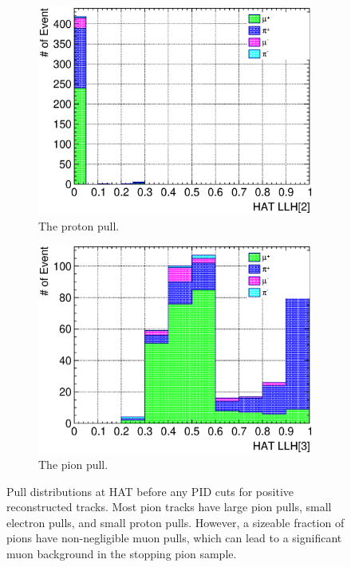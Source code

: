\begin{figure}[ht]
\begin{subfigure}{\dbfigwid\textwidth}
               \end{subfigure}
               \\
               \begin{subfigure}{\dbfigwid\textwidth}
                    \includegraphics[width=\textwidth]{figures/sel/sspi_TOP_hat_pid2_stack_al5.eps}
                    \caption{The proton pull.}
                    \label{subfig:sppi-pulls-3}
               \end{subfigure}
               \begin{subfigure}{\dbfigwid\textwidth}
                    \includegraphics[width=\textwidth]{figures/sel/sspi_TOP_hat_pid3_stack_al5.eps}
                    \caption{The pion pull.}
                    \label{subfig:sppi-pulls-4}
               \end{subfigure}
               \caption{Pull distributions at HAT before any PID cuts for positive reconstructed tracks. Most pion tracks have large pion pulls, small electron pulls, and small proton pulls. However, a sizeable fraction of pions have non-negligible muon pulls, which can lead to a significant muon background in the stopping pion sample.}
               \label{fig:pulls}
          \end{figure}

